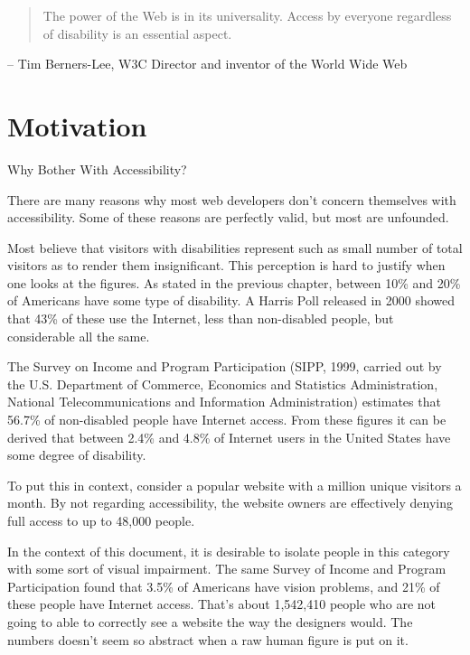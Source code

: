 
\begin{quotation}
The power of the Web is in its universality. Access by everyone regardless of
disability is an essential aspect.
\end{quotation}
 -- Tim Berners-Lee, W3C Director and inventor of the World Wide Web

\section{Motivation}

Why Bother With Accessibility?

There are many reasons why most web developers don't concern themselves with
accessibility. Some of these reasons are perfectly valid, but most are
unfounded.

Most believe that visitors with disabilities represent such as small number of
total visitors as to render them insignificant. This perception is hard to
justify when one looks at the figures. As stated in the previous chapter, between 10\% and 20\%
of Americans have some type of disability. A Harris Poll released in
2000 showed that 43\% of these use the Internet, less than non-disabled people,
but considerable all the same. 

The Survey on Income and Program Participation (SIPP, 1999, carried out by the
U.S. Department of Commerce, Economics and Statistics Administration, National
Telecommunications and Information Administration) estimates that 56.7\% of
non-disabled people have Internet access. From these figures it can be derived
that between 2.4\% and 4.8\% of Internet users in the United States have some
degree of disability. 

To put this in context, consider a popular website with a million unique
visitors a month. By not regarding accessibility, the website owners are
effectively denying full access to up to 48,000 people. 

In the context of this document, it is desirable to isolate people in this
category with some sort of visual impairment. The same Survey of Income and
Program Participation found that 3.5\% of Americans have vision problems, and 
21\% of these people have Internet access. That's about 1,542,410 people
who are not going to able to correctly see a website the way the designers
would. The numbers doesn't seem so abstract when a raw human figure is
put on it.

